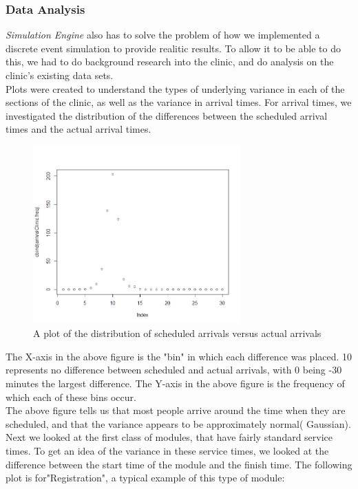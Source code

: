 \documentclass[12pt]{article}
\begin{document}
\subsubsection{Data Analysis}
\textit{Simulation Engine} also has to solve the problem of how we implemented a discrete event simulation to provide realitic results. 
To allow it to be able to do this, we had to do background research into the clinic, and do analysis on the clinic's existing data sets. \\
Plots were created to understand the types of underlying variance in each of the sections of the clinic, as well as the variance in arrival times. For arrival times, we investigated the distribution of the differences between the scheduled arrival times and the actual arrival times. 

\begin{figure}[H]
	\centering
	\includegraphics[width=8cm]{ScheduledVersusActual}
	\caption{A plot of the distribution of scheduled arrivals versus actual arrivals}
\end{figure}
The X-axis in the above figure is the "bin" in which each difference was placed. 10 represents no difference between scheduled and actual arrivals, with 0 being -30 minutes the largest difference. The Y-axis in the above figure is the frequency of which each of these bins occur. \\
The above figure tells us that most people arrive around the time when they are scheduled, and that the variance appears to be approximately normal( Gaussian). \\
Next we looked at the first class of modules, that have fairly standard service times. To get an idea of the variance in these service times, we looked at the difference between the start time of the module and the finish time. The following plot is for"Registration", a typical example of this type of module: \\
\end{document}
